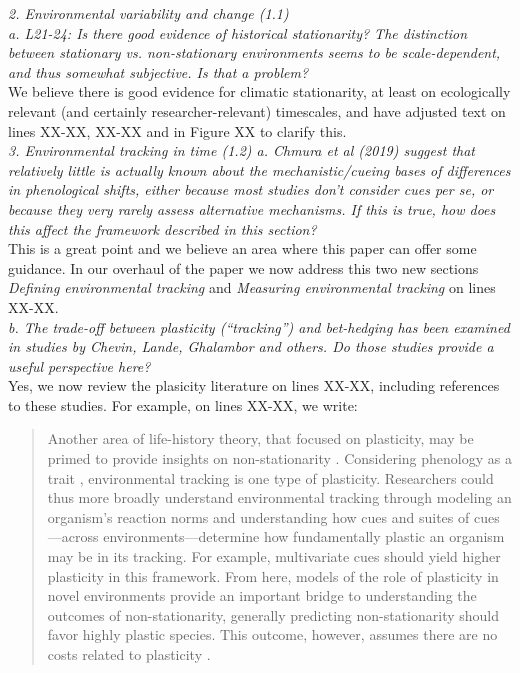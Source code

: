 \documentclass[11pt]{article}
\begin{document}
\emph{2.      Environmental variability and change (1.1)\\
a.      L21-24: Is there good evidence of historical stationarity? The distinction between
stationary vs. non-stationary environments seems to be scale-dependent, and thus somewhat
subjective. Is that a problem?}\\

We believe there is good evidence for climatic stationarity, at least on ecologically relevant (and certainly researcher-relevant) timescales, and have adjusted text on lines XX-XX, XX-XX and in Figure XX to clarify this. \\

\emph{3.      Environmental tracking in time (1.2)
a.      Chmura et al (2019) suggest that relatively little is actually known about the
mechanistic/cueing bases of differences in phenological shifts, either because most studies
don’t consider cues per se, or because they very rarely assess alternative mechanisms. If
this is true, how does this affect the framework described in this section?}\\

This is a great point and we believe an area where this paper can offer some guidance. In our overhaul of the paper we now address this two new sections \emph{Defining environmental tracking} and \emph{Measuring environmental tracking} on lines XX-XX.\\

\emph{b.      The trade-off between plasticity (``tracking'') and bet-hedging has been examined in
studies by Chevin, Lande, Ghalambor and others. Do those studies provide a useful perspective
here?}\\

Yes, we now review the plasicity literature on lines XX-XX, including references to these studies. For example, on lines XX-XX, we write: 
\begin{quote}
Another area of life-history theory, that focused on plasticity, may be primed to provide insights on non-stationarity \citep[or `sustained environmental change,' see][]{chevin2010}. Considering phenology as a trait \citep[as we and others do, e.g.,][]{charm2008,nicotra2010,inouye2019}, environmental tracking is one type of plasticity. Researchers could thus more broadly understand environmental tracking through modeling an organism's reaction norms \citep{pigluicci1998,chmura2019} and understanding how cues and suites of cues---across environments---determine how fundamentally plastic an organism may be in its tracking. For example, multivariate cues should yield higher plasticity in this framework. From here, models of the role of plasticity in novel environments provide an important bridge to understanding the outcomes of non-stationarity, generally predicting non-stationarity should favor highly plastic species. This outcome, however, assumes there are no costs related to plasticity \citep{Ghalambor2007,tufto2015}. 
\end{quote}
\end{document}
